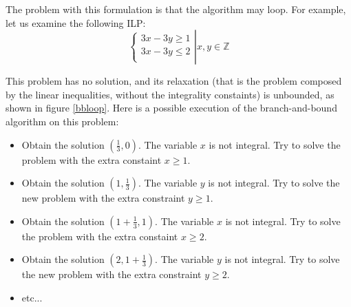 \documentclass{article}
\newcommand{\cunsat}{\texttt{Unsatisfiable}}
\newcommand{\ints}{\mathbb{Z}}
\begin{document}
%

The problem with this formulation is that the algorithm may loop. For example,
let us examine the following ILP:
\begin{equation} \label{pbloop}
  \left\{
  \begin{array}{l}
    3x - 3y \geqslant 1 \\
    3x - 3y \leqslant 2 \\
  \end{array}
  \right|
  x, y \in \ints
\end{equation}

This problem has no solution, and its relaxation (that is the problem composed
by the linear inequalities, without the integrality constaints) is unbounded, as
shown in figure \ref{bbloop}. Here is a possible execution of the
branch-and-bound algorithm on this problem:
\begin{itemize}
  \item Obtain the solution $(\frac{1}{3}, 0)$. The variable $x$ is not
    integral. Try to solve the problem with the extra constaint
    $x \geqslant 1$.
  \item Obtain the solution $(1, \frac{1}{3})$. The variable $y$ is not
    integral. Try to solve the new problem with the extra constraint $y
    \geqslant 1$.
  \item Obtain the solution $(1 + \frac{1}{3}, 1)$. The variable $x$ is not
    integral. Try to solve the problem with the extra constaint
    $x \geqslant 2$.
  \item Obtain the solution $(2, 1 + \frac{1}{3})$. The variable $y$ is not
    integral. Try to solve the new problem with the extra constraint $y
    \geqslant 2$.
  \item etc...
\end{itemize}
\end{document}
